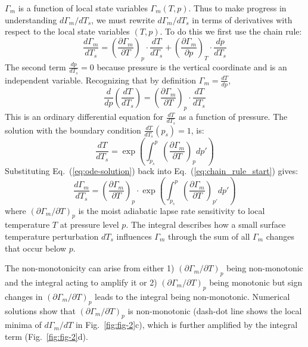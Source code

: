 \documentclass[draft]{ametsocV6.1}
\begin{document}
$\Gamma_m$ is a function of local state variables $\Gamma_m(T, p)$. Thus to make progress in understanding $d\Gamma_m/dT_s$, we must rewrite $d\Gamma_m/dT_s$ in terms of derivatives with respect to the local state variables $(T, p)$. To do this we first use the chain rule: 
\begin{equation}
\frac{d\Gamma_m}{dT_s} = \left(\frac{\partial\Gamma_m}{\partial T}\right)_p \cdot \frac{dT}{dT_s} + \left(\frac{\partial\Gamma_m}{\partial p}\right)_T \cdot \frac{dp}{dT_s} \label{eq:chain_rule_start}
\end{equation}
The second term $\frac{dp}{dT_s}=0$ because pressure is the vertical coordinate and is an independent variable. Recognizing that by definition $\Gamma_m = \frac{dT}{dp}$,
\begin{equation}
    \frac{d}{dp}\left(\frac{dT}{dT_s}\right) = \left(\frac{\partial\Gamma_m}{\partial T}\right)_p \cdot \frac{dT}{dT_s} 
    \label{eq:ode}
\end{equation}
This is an ordinary differential equation for $\frac{dT}{dT_s}$ as a function of pressure. The solution with the boundary condition $\frac{dT}{dT_s}(p_s) = 1$, is:
\begin{equation}
    \frac{dT}{dT_s} = \exp\left(\int_{p_s}^{p} \left(\frac{\partial\Gamma_m}{\partial T}\right)_p dp'\right)
    \label{eq:ode-solution}
\end{equation}
Substituting Eq.~(\ref{eq:ode-solution}) back into Eq.~(\ref{eq:chain_rule_start}) gives:
\begin{equation}
\frac{d\Gamma_m}{dT_s} = \left(\frac{\partial\Gamma_m}{\partial T}\right)_p \cdot \exp\left(\int_{p_s}^{p} \left(\frac{\partial\Gamma_m}{\partial T}\right)_{p'} dp'\right) \label{eq:total_sensitivity}
\end{equation}
where $(\partial\Gamma_m/\partial T)_p$ is the moist adiabatic lapse rate sensitivity to local temperature $T$ at pressure level $p$. The integral describes how a small surface temperature perturbation $dT_s$ influences $\Gamma_m$ through the sum of all $\Gamma_m$ changes that occur below $p$.

The non-monotonicity can arise from either 1) $(\partial\Gamma_m/\partial T)_p$ being non-monotonic and the integral acting to amplify it or 2) $(\partial\Gamma_m/\partial T)_p$ being monotonic but sign changes in $(\partial\Gamma_m/\partial T)_p$ leads to the integral being non-monotonic. Numerical solutions show that $(\partial\Gamma_m/\partial T)_p$ is non-monotonic (dash-dot line shows the local minima of $d\Gamma_m/dT$ in Fig.~\ref{fig:fig-2}c), which is further amplified by the integral term (Fig.~\ref{fig:fig-2}d).
\end{document}
